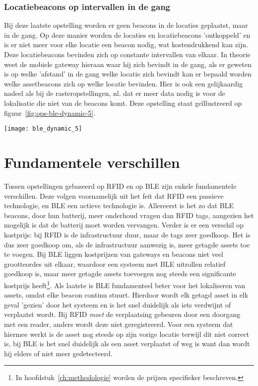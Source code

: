 \subsubsection{Locatiebeacons op intervallen in de gang}
\begin{minipage}{0.65\textwidth}
Bij deze laatste opstelling worden er geen beacons in de locaties geplaatst, maar in de gang. Op deze manier worden de locaties en locatiebeacons 'ontkoppeld' en is er niet meer voor elke locatie een beacon nodig, wat kostendrukkend kan zijn. Deze locatiebeacons bevinden zich op constante intervallen van elkaar. In theorie weet de mobiele gateway hieraan waar hij zich bevindt in de gang, als er geweten is op welke 'afstand' in de gang welke locatie zich bevindt kan er bepaald worden welke assetbeacons zich op welke locatie bevinden. Hier is ook een gelijkaardig nadeel als bij de rasteropstellingen, nl. dat er meer data nodig is voor de lokalisatie die niet van de beacons komt. Deze opstelling staat geïllustreerd op figuur~\ref{fig:ops-ble-dynamic-5}.
\end{minipage}
\hfill
\begin{minipage}{0.30\textwidth}
	\texttt{[image: ble\_dynamic\_5]}
	\label{fig:ops-ble-dynamic-5}
\end{minipage}

\section{Fundamentele verschillen}
Tussen opstellingen gebaseerd op RFID en op BLE zijn enkele fundamentele verschillen. Deze volgen voornamelijk uit het feit dat RFID een passieve technologie, en BLE een actieve technologie is. Allereerst is het zo dat BLE beacons, door hun batterij, meer onderhoud vragen dan RFID tags, aangezien het mogelijk is dat de batterij moet worden vervangen. Verder is er een verschil op kostprijs: bij RFID is de infrastructuur duur, maar de tags zeer goedkoop. Het is dus zeer goedkoop om, als de infrastructuur aanwezig is, meer getagde assets toe te voegen. Bij BLE liggen kostprijzen van gateways en beacons niet veel grootteordes uit elkaar, waardoor een systeem met BLE uitrollen relatief goedkoop is, maar meer getagde assets toevoegen nog steeds een significante kostprijs heeft\footnote{In hoofdstuk~\ref{ch:methodologie} worden de prijzen specifieker beschreven.}. Als laatste is BLE fundamenteel beter voor het lokaliseren van assets, omdat elke beacon continu stuurt. Hierdoor wordt elk getagd asset in elk geval 'gezien' door het systeem en is het snel duidelijk als iets verdwijnt of verplaatst wordt. Bij RFID \emph{moet} de verplaatsing gebeuren door een doorgang met een reader, anders wordt deze niet geregistreerd. Voor een systeem dat hiermee werkt is de asset nog steeds op zijn vorige locatie terwijl dit niet correct is, bij BLE is het snel duidelijk als een asset verplaatst of weg is want dan wordt hij elders of niet meer gedetecteerd.



